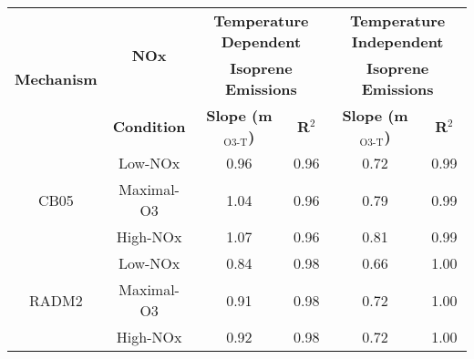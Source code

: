 {\renewcommand{\arraystretch}{1.2}
\begin{tabular}{c|c|c|c|c|c}
	\hline\hline
	\multirow{3}{*}{\textbf{Mechanism}} & \multirow{2}{*}{\textbf{NOx}} & \multicolumn{2}{c|}{\textbf{Temperature Dependent}} & \multicolumn{2}{c}{\textbf{Temperature Independent}} \\ 
	 & & \multicolumn{2}{c|}{\textbf{Isoprene Emissions}} &  \multicolumn{2}{c}{\textbf{Isoprene Emissions}} \\ \cline{3-6} 
	 & \textbf{Condition} & \textbf{Slope (m$_{\text{O3-T}}$)} & \textbf{R$^2$} & \textbf{Slope (m$_{\text{O3-T}}$)} & \textbf{R$^2$} \\ 
	\hline\hline
	\multirow{3}{*}{CB05} & Low-NOx & 0.96 & 0.96 & 0.72 & 0.99 \\ 
	 & Maximal-O3 & 1.04 & 0.96 & 0.79 & 0.99 \\ 
	 & High-NOx & 1.07 & 0.96 & 0.81 & 0.99 \\ 
	\hline
	\multirow{3}{*}{RADM2} & Low-NOx & 0.84 & 0.98 & 0.66 & 1.00 \\ 
	 & Maximal-O3 & 0.91 & 0.98 & 0.72 & 1.00 \\ 
	 & High-NOx & 0.92 & 0.98 & 0.72 & 1.00 \\ 
	\hline
	\hline\hline
\end{tabular}}
